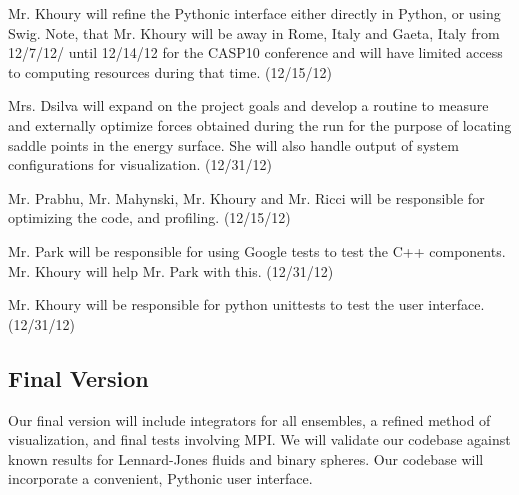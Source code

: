 \documentclass[10pt]{article}
\begin{document}
Mr. Khoury will refine the Pythonic interface either directly in Python, or using Swig. Note, that Mr. Khoury will be away in Rome, Italy and Gaeta, Italy from 12/7/12/ until 12/14/12 for the CASP10 conference and will have limited access to computing resources during that time.   (12/15/12)

Mrs. Dsilva will expand on the project goals and develop a routine to measure and externally optimize forces obtained during the run for the purpose of locating saddle points in the energy surface.  She will also handle output of system configurations for visualization.  (12/31/12)

Mr. Prabhu, Mr. Mahynski, Mr. Khoury and Mr. Ricci will  be responsible for optimizing the code, and profiling. (12/15/12)

Mr. Park will be responsible for using Google tests to test the C++ components. Mr. Khoury will help Mr. Park with this. (12/31/12)

Mr. Khoury will be responsible for python unittests to test the user interface. (12/31/12)

\subsection{Final Version}
Our final version will include integrators for all ensembles, a refined method of visualization, and final tests involving MPI.  We will validate our codebase against known results for Lennard-Jones fluids and binary spheres.  Our codebase will incorporate a convenient, Pythonic user interface.
\end{document}
